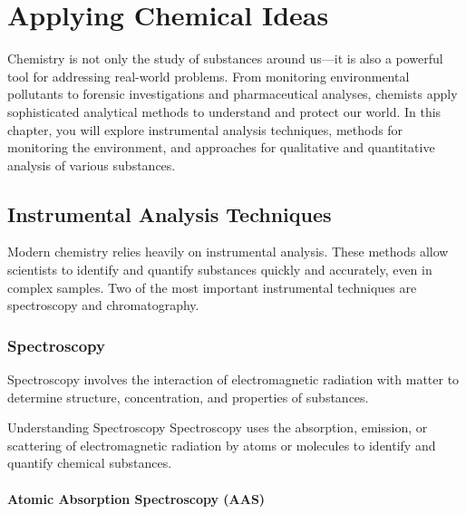 \chapter{Applying Chemical Ideas}
\label{chap:applying-chemical-ideas}

Chemistry is not only the study of substances around us—it is also a powerful tool for addressing real-world problems. From monitoring environmental pollutants to forensic investigations and pharmaceutical analyses, chemists apply sophisticated analytical methods to understand and protect our world. In this chapter, you will explore instrumental analysis techniques, methods for monitoring the environment, and approaches for qualitative and quantitative analysis of various substances.

\section{Instrumental Analysis Techniques}
\FloatBarrier
\FloatBarrier
\FloatBarrier

Modern chemistry relies heavily on instrumental analysis. These methods allow scientists to identify and quantify substances quickly and accurately, even in complex samples. Two of the most important instrumental techniques are spectroscopy and chromatography.

\subsection{Spectroscopy}
\FloatBarrier
\FloatBarrier
\FloatBarrier

Spectroscopy involves the interaction of electromagnetic radiation with matter to determine structure, concentration, and properties of substances.

\begin{keyconcept}{Understanding Spectroscopy}
Spectroscopy uses the absorption, emission, or scattering of electromagnetic radiation by atoms or molecules to identify and quantify chemical substances.
\end{keyconcept}


\subsubsection{Atomic Absorption Spectroscopy (AAS)}

